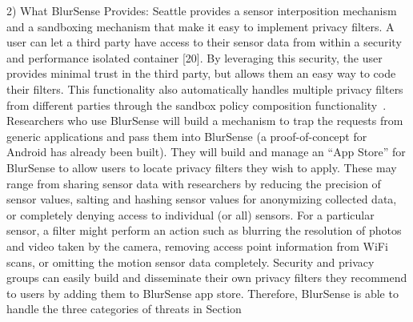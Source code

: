 {{2) What BlurSense Provides: Seattle provides a sensor
interposition mechanism and a sandboxing mechanism that
make it easy to implement privacy filters. A user can let a third
party have access to their sensor data from within a security
and performance isolated container [20]. By leveraging this
security, the user provides minimal trust in the third party,
but allows them an easy way to code their filters. This
functionality also automatically handles multiple privacy filters
from different parties through the sandbox policy composition
functionality~\cite{Cappos_CCS_10}.
Researchers who use BlurSense will build a mechanism
to trap the requests from generic  applications and pass them
into BlurSense (a proof-of-concept for Android has already
been built). They will build and manage an ``App Store'' for
BlurSense to allow users to locate privacy filters they wish
to apply. These may range from sharing sensor data with
researchers by reducing the precision of sensor values, salting
and hashing sensor values for anonymizing collected data,
or completely denying access to individual (or all) sensors.
For a particular sensor, a filter might perform an action such
as blurring the resolution of photos and video taken by the
camera, removing access point information from WiFi scans,
or omitting the motion sensor data completely. Security and
privacy groups can easily build and disseminate their own
privacy filters they recommend to users by adding them to
BlurSense app store. Therefore, BlurSense is able to handle
the three categories of threats in Section



}}

